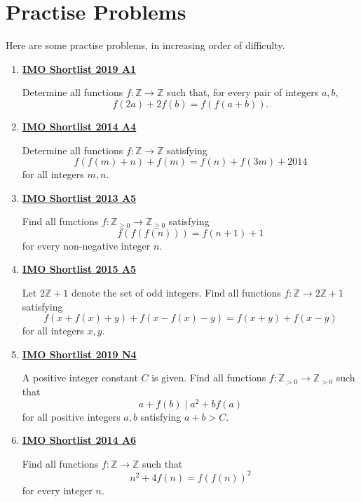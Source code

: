 \documentclass[10pt,letterpaper]{article}
\begin{document}
\section{Practise Problems}
Here are some practise problems, in increasing order of difficulty.
\begin{enumerate}
\setlength{\itemsep}{12pt}
\item \textbf{\href{https://www.imo-official.org/problems/IMO2019SL.pdf}{IMO Shortlist 2019 A1}}\par
Determine all functions $f:\mathbb{Z}\to\mathbb{Z}$ such that, for every pair of integers $a,b$,
\[f(2a)+2f(b)=f(f(a+b)).\]
\item \textbf{\href{https://www.imo-official.org/problems/IMO2014SL.pdf}{IMO Shortlist 2014 A4}}\par
Determine all functions $f:\mathbb{Z}\to\mathbb{Z}$ satisfying
\[f(f(m)+n)+f(m)=f(n)+f(3m)+2014\]
for all integers $m,n$.
\item \textbf{\href{https://www.imo-official.org/problems/IMO2013SL.pdf}{IMO Shortlist 2013 A5}}\par
Find all functions $f:\mathbb{Z}_{\ge0}\to\mathbb{Z}_{\ge0}$ satisfying
\[f(f(f(n)))=f(n+1)+1\]
for every non-negative integer $n$.
\item \textbf{\href{https://www.imo-official.org/problems/IMO2015SL.pdf}{IMO Shortlist 2015 A5}}\par
Let $2\mathbb{Z}+1$ denote the set of odd integers. Find all functions $f:\mathbb{Z}\to2\mathbb{Z}+1$ satisfying
\[f(x+f(x)+y)+f(x-f(x)-y)=f(x+y)+f(x-y)\]
for all integers $x,y$.
\item \textbf{\href{https://www.imo-official.org/problems/IMO2019SL.pdf}{IMO Shortlist 2019 N4}}\par
A positive integer constant $C$ is given. Find all functions $f:\mathbb{Z}_{>0}\to\mathbb{Z}_{>0}$ such that
\[a+f(b)\mid a^2+bf(a)\]
for all positive integers $a,b$ satisfying $a+b>C$.
\item \textbf{\href{https://www.imo-official.org/problems/IMO2014SL.pdf}{IMO Shortlist 2014 A6}}\par
Find all functions $f:\mathbb{Z}\to\mathbb{Z}$ such that
\[n^2+4f(n)=f(f(n))^2\]
for every integer $n$.
\end{enumerate}
\end{document}
